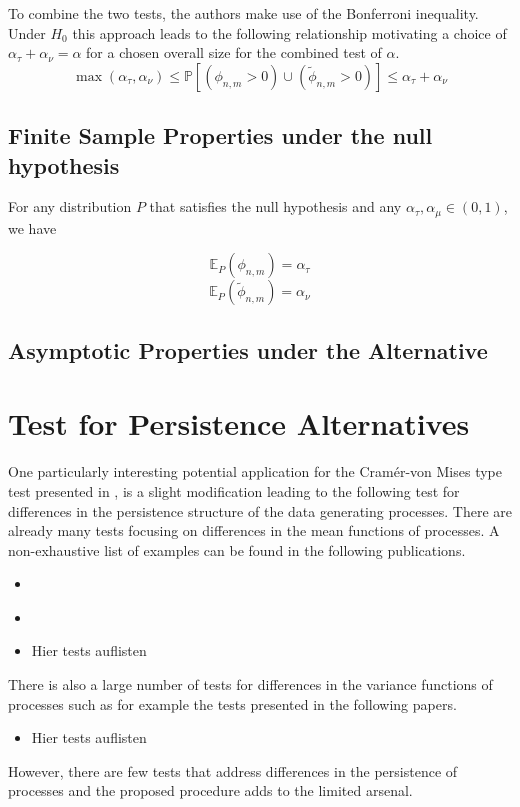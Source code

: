 \documentclass[12pt, a4paper]{article}
\theoremstyle{MAstyle} \newtheorem{assumption}{Assumption}[section]
\theoremstyle{MAstyle} \newtheorem{definition}{Definition}[section]
\theoremstyle{MAstyle} \newtheorem{theorem}{Theorem}[section]
\begin{document}
			To combine the two tests, the authors make use of the Bonferroni inequality. Under $H_0$ this approach leads to the following relationship motivating a choice of $\alpha_{\tau} + \alpha_{\nu} = \alpha$ for a chosen overall size for the combined test of $\alpha$.
			\begin{equation}
				\max(\alpha_{\tau}, \alpha_{\nu}) \leq \mathbb{P}\left[(\phi_{n,m} > 0) \cup (\tilde{\phi}_{n,m} > 0)\right] \leq \alpha_{\tau} + \alpha_{\nu}
			\end{equation}
		
		\subsection{Finite Sample Properties under the null hypothesis}
		For any distribution $P$ that satisfies the null hypothesis and any $\alpha_{\tau}, \alpha_{\mu} \in (0,1)$, we have 
		\begin{multicols}{2}
			\noindent
			\begin{equation*}
				\mathbb{E}_P\left(\phi_{n,m}\right) = \alpha_{\tau}
			\end{equation*}			
			\begin{equation}
				\mathbb{E}_P\left(\tilde{\phi}_{n,m}\right) = \alpha_{\nu}
			\end{equation}
		\end{multicols}
		
		\subsection{Asymptotic Properties under the Alternative}
		
	\section{Test for Persistence Alternatives}\label{variant}
		One particularly interesting potential application for the Cram\'{e}r-von Mises type test presented in \cite{bugni_permutation_2021}, is a slight modification leading to the following test for differences in the persistence structure of the data generating processes. 
		There are already many tests focusing on differences in the mean functions of processes. A non-exhaustive list of examples can be found in the following publications.
		\begin{itemize}
			\item \cite{lee_two_2015}
			\item \cite{cox_pointwise_2008}
			\item {\color{red} Hier tests auflisten}
		\end{itemize}
		There is also a large number of tests for differences in the variance functions of processes such as for example the tests presented in the following papers. 
		\begin{itemize}
			\item {\color{red} Hier tests auflisten}
		\end{itemize}
		However, there are few tests that address differences in the persistence of processes and the proposed procedure adds to the limited arsenal.\\
		
\end{document}
